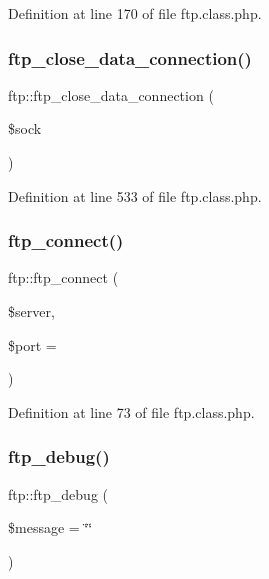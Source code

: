 Definition at line 170 of file ftp.\+class.\+php.

\hypertarget{classftp_ae476d651d3ec9ea3b00f19371d9fcece}{}\label{classftp_ae476d651d3ec9ea3b00f19371d9fcece} 
\subsubsection{\texorpdfstring{ftp\+\_\+close\+\_\+data\+\_\+connection()}{ftp\_close\_data\_connection()}}
{\footnotesize\ttfamily ftp\+::ftp\+\_\+close\+\_\+data\+\_\+connection (\begin{DoxyParamCaption}\item[{}]{\$sock }\end{DoxyParamCaption})}



Definition at line 533 of file ftp.\+class.\+php.

\hypertarget{classftp_aadbf8f460f13c6ced454e50d91ed77c3}{}\label{classftp_aadbf8f460f13c6ced454e50d91ed77c3} 
\subsubsection{\texorpdfstring{ftp\+\_\+connect()}{ftp\_connect()}}
{\footnotesize\ttfamily ftp\+::ftp\+\_\+connect (\begin{DoxyParamCaption}\item[{}]{\$server,  }\item[{}]{\$port = {} }\end{DoxyParamCaption})}



Definition at line 73 of file ftp.\+class.\+php.

\hypertarget{classftp_adb6a01340ad0c2f579fae61b8777aaad}{}\label{classftp_adb6a01340ad0c2f579fae61b8777aaad} 
\subsubsection{\texorpdfstring{ftp\+\_\+debug()}{ftp\_debug()}}
{\footnotesize\ttfamily ftp\+::ftp\+\_\+debug (\begin{DoxyParamCaption}\item[{}]{\$message = {\ttfamily \char`\"{}\char`\"{}} }\end{DoxyParamCaption})}



